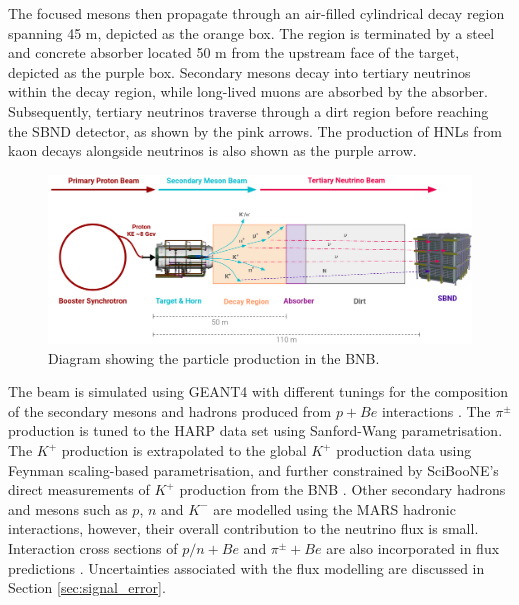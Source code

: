 The focused mesons then propagate through an air-filled cylindrical decay region spanning 45 m, depicted as the orange box.
The region is terminated by a steel and concrete absorber located 50 m from the upstream face of the target, depicted as the purple box.
Secondary mesons decay into tertiary neutrinos within the decay region, while long-lived muons are absorbed by the absorber. 
Subsequently, tertiary neutrinos traverse through a dirt region before reaching the SBND detector, as shown by the pink arrows.
The production of HNLs from kaon decays alongside neutrinos is also shown as the purple arrow.

\begin{figure}[hb!] 
\centering    
\includegraphics[width=1.0\textwidth]{BNBDiagram}
\caption[Particle Production in the Booster Neutrino Beam]{
Diagram showing the particle production in the BNB.
}
\label{fig:BNBDiagram}
\end{figure}

The beam is simulated using GEANT4 with different tunings for the composition of the secondary mesons and hadrons produced from $p + Be$ interactions \cite{BNBMiniBooNE}.
The $\pi^{\pm}$ production is tuned to the HARP data set using Sanford-Wang parametrisation.
The $K^{+}$ production is extrapolated to the global $K^{+}$ production data using Feynman scaling-based parametrisation, and further constrained by SciBooNE's direct measurements of $K^{+}$ production from the BNB \cite{SciBooNE}. 
Other secondary hadrons and mesons such as $p$, $n$ and $K^{-}$ are modelled using the MARS hadronic interactions, however, their overall contribution to the neutrino flux is small. 
Interaction cross sections of $p/n + Be$ and $\pi^{\pm} + Be$ are also incorporated in flux predictions \cite{DavePhd}.
Uncertainties associated with the flux modelling are discussed in Section \ref{sec:signal_error}.

